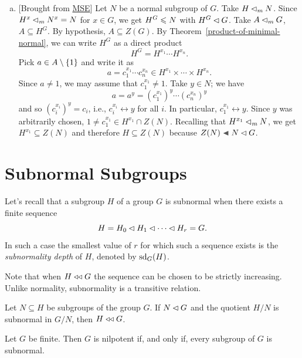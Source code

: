 \begin{solution}
\begin{enumerate}[a),font=\upshape]
    \item {[Brought from \href{https://math.stackexchange.com/a/2703032/269050}{MSE}]} Let $N$ be a normal subgroup of $G$. Take $H\lhd_mN$. Since $H^x\lhd_mN^x=N$ for $x\in G$, we get $H^G\leqslant N$ with $H^G\lhd G$. Take $A\lhd_mG$, $A\subseteq H^G$. By hypothesis, $A\subseteq Z(G)$. By Theorem~\ref{product-of-minimal-normal}, we can write $H^G$ as a direct product
    $$
        H^G = H^{x_1}\cdots H^{x_n}.
    $$
    Pick $a\in A\setminus\{1\}$ and write it as
    $$
        a=c_1^{x_1}\cdots c_{n}^{x_n}
            \in H^{x_1}\times\cdots\times H^{x_n}.
    $$
    Since $a\ne1$, we may assume that $c_1^{x_1}\ne1$. Take $y\in N$; we have
    $$
        a = a^y = (c_1^{x_1})^y\cdots (c_n^{x_n})^y
    $$
    and so $(c_i^{x_i})^y=c_i$, i.e., $c_i^{x_i}\leftrightarrow y$ for all $i$. In particular, $c_1^{x_1}\leftrightarrow y$. Since $y$ was arbitrarily chosen, $1\ne c_1^{x_1}\in H^{x_1}\cap Z(N)$. Recalling that $H^{x_1}\lhd_mN$, we get $H^{x_1}\subseteq Z(N)$ and therefore $H\subseteq Z(N)$ because $Z(N)\ch N\normal G$.
\end{enumerate}
\end{solution}


\section{Subnormal Subgroups}
\begin{defn}
    Let's recall that a subgroup\/ $H$ of a group\/ $G$ is subnormal when there exists a finite sequence
    $$
        H = H_0 \lhd H_1 \lhd \cdots \lhd H_r = G.
    $$
    In such a case the smallest value of\/ $r$ for which such a sequence exists is the \textsl{subnormality depth} of\/ $H$, denoted by ${\rm sd}_G(H)$.
\end{defn}

\begin{rem}
    Note that when $H\mathrel{\triangleleft\triangleleft} G$ the sequence can be chosen to be strictly increasing. Unlike normality, subnormality is a transitive relation.
\end{rem}

\begin{rem}
    Let\/ $N\subseteq H$ be subgroups of the group\/ $G$. If $N\lhd G$ and the quotient $H/N$ is subnormal in $G/N$, then $H\mathrel{\triangleleft\triangleleft} G$.
\end{rem}

\begin{lem}\label{nilpotent-lemma}
    Let\/ $G$ be finite. Then\/ $G$ is nilpotent if, and only if, every subgroup of\/ $G$ is subnormal.
\end{lem}

